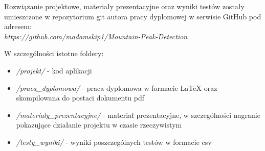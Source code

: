 \newpage
{}

Rozwiązanie projektowe, materiały prezentacyjne oraz wyniki testów zostały umieszczone w repozytorium git autora pracy dyplomowej w serwisie GitHub pod adresem:  \\
\textit{https://github.com/madamskip1/Mountain-Peak-Detection}

\vspace{5mm}

W szczególności istotne foldery:

\begin{itemize}
    \item \textit{/projekt/} - kod aplikacji 
    \item \textit{/praca\_dyplomowa/} - praca dyplomowa w formacie LaTeX oraz skompilowana do postaci dokumentu pdf
    \item \textit{/materialy\_prezentacyjne/} - materiał prezentacyjne, w szczególności nagranie pokazujące działanie projektu w czasie rzeczywistym
    \item \textit{/testy\_wyniki/} - wyniki poszczególnych testów w formacie csv
\end{itemize}